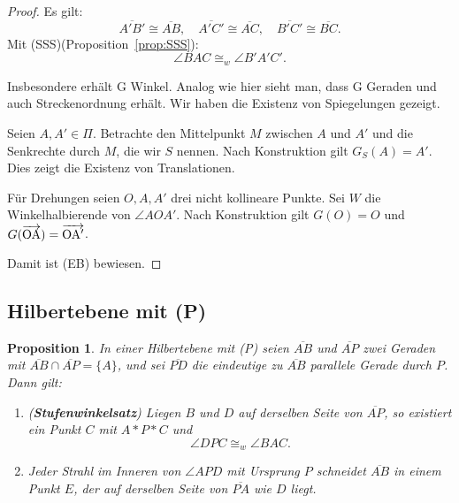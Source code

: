 \documentclass[a4paper,12pt]{article}
\theoremstyle{break}
\newtheorem{proposition}[definition]{Proposition}
\begin{document}
\begin{proof}
Es gilt:
\[
\overline{A'B'} \cong \overline{AB}, \quad \overline{A'C'} \cong \overline{AC}, \quad \overline{B'C'} \cong \overline{BC}.
\]
Mit (SSS)(Proposition~\ref{prop:SSS}):
\[
\angle BAC \cong_w \angle B'A'C'.
\]

Insbesondere erhält G Winkel. Analog wie hier sieht man, dass G Geraden und auch Streckenordnung erhält. Wir haben die Existenz von Spiegelungen gezeigt.

Seien \(A, A' \in \Pi\). Betrachte den Mittelpunkt \(M\) zwischen \(A\) und \(A'\) und die Senkrechte durch \(M\), die wir \(S\) nennen. Nach Konstruktion gilt \(G_S(A) = A'\). Dies zeigt die Existenz von Translationen.  

Für Drehungen seien \(O, A, A'\) drei nicht kollineare Punkte. Sei \(W\) die Winkelhalbierende von \(\angle AOA'\). Nach Konstruktion gilt \(G(O) = O\) und \(G(\overrightarrow{\rm OA}) = \overrightarrow{\rm OA'}\).

Damit ist (EB) bewiesen.
\end{proof}

\begin{center}
\end{center}

\subsection{Hilbertebene mit (P)}

\begin{proposition}
In einer Hilbertebene mit (P) seien \(\overline{AB}\) und \(\overline{AP}\) zwei Geraden mit \(\overline{AB} \cap \overline{AP} = \{A\}\), und sei \(\overline{PD}\) die eindeutige zu \(\overline{AB}\) parallele Gerade durch \(P\). Dann gilt:
\begin{enumerate}
    \item (\textbf{Stufenwinkelsatz}) Liegen \(B\) und \(D\) auf derselben Seite von \(\overline{AP}\), so existiert ein Punkt \(C\) mit \(A * P * C\) und 
    \[
    \angle DPC \cong_w \angle BAC.
    \]
    \item Jeder Strahl im Inneren von \(\angle APD\) mit Ursprung \(P\) schneidet \(\overline{AB}\) in einem Punkt \(E\), der auf derselben Seite von \(\overline{PA}\) wie \(D\) liegt.
\end{enumerate}
\end{proposition}
\end{document}
